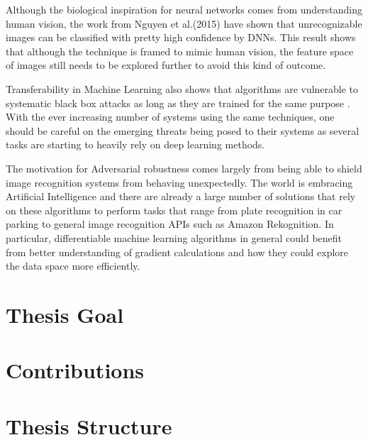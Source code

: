 Although the biological inspiration for neural networks comes from understanding human vision, the work from Nguyen et al.(2015) \cite{nguyen2015} have shown that unrecognizable images can be classified with pretty high confidence by DNNs. This result shows that although the technique is framed to mimic human vision, the feature space of images still needs to be explored further to avoid this kind of outcome.

Transferability in Machine Learning also shows that algorithms are vulnerable to systematic black box attacks as long as they are trained for the same purpose \cite{papernot2016transf}. With the ever increasing number of systems using the same techniques, one should be careful on the emerging threats being posed to their systems as several tasks are starting to heavily rely on deep learning methods.

The motivation for Adversarial robustness comes largely from being able to shield image recognition systems from behaving unexpectedly. The world is embracing Artificial Intelligence and there are already a large number of solutions that rely on these algorithms to perform tasks that range from plate recognition in car parking to general image recognition APIs such as Amazon Rekognition. In particular, differentiable machine learning algorithms in general could benefit from better understanding of gradient calculations and how they could explore the data space more efficiently.



\section{Thesis Goal}
\section{Contributions}
\section{Thesis Structure}


